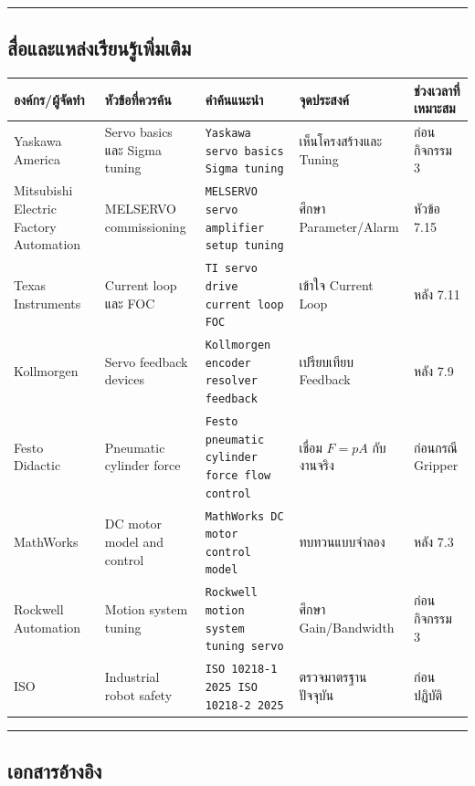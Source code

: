 \par\noindent\rule{\textwidth}{0.4pt}\par

\subsection{สื่อและแหล่งเรียนรู้เพิ่มเติม}

\begin{table}[htbp]
    \centering
    \begin{tabular}{l l l l l}
        \hline
        \textbf{องค์กร/ผู้จัดทำ} & \textbf{หัวข้อที่ควรค้น} & \textbf{คำค้นแนะนำ} & \textbf{จุดประสงค์} & \textbf{ช่วงเวลาที่เหมาะสม} \\
        \hline
        Yaskawa America & Servo basics และ Sigma tuning & \texttt{Yaskawa servo basics Sigma tuning} & เห็นโครงสร้างและ Tuning & ก่อนกิจกรรม 3 \\
        Mitsubishi Electric Factory Automation & MELSERVO commissioning & \texttt{MELSERVO servo amplifier setup tuning} & ศึกษา Parameter/Alarm & หัวข้อ 7.15 \\
        Texas Instruments & Current loop และ FOC & \texttt{TI servo drive current loop FOC} & เข้าใจ Current Loop & หลัง 7.11 \\
        Kollmorgen & Servo feedback devices & \texttt{Kollmorgen encoder resolver feedback} & เปรียบเทียบ Feedback & หลัง 7.9 \\
        Festo Didactic & Pneumatic cylinder force & \texttt{Festo pneumatic cylinder force flow control} & เชื่อม $F=pA$ กับงานจริง & ก่อนกรณี Gripper \\
        MathWorks & DC motor model and control & \texttt{MathWorks DC motor control model} & ทบทวนแบบจำลอง & หลัง 7.3 \\
        Rockwell Automation & Motion system tuning & \texttt{Rockwell motion system tuning servo} & ศึกษา Gain/Bandwidth & ก่อนกิจกรรม 3 \\
        ISO & Industrial robot safety & \texttt{ISO 10218-1 2025 ISO 10218-2 2025} & ตรวจมาตรฐานปัจจุบัน & ก่อนปฏิบัติ \\
        \hline
    \end{tabular}
\end{table}

\par\noindent\rule{\textwidth}{0.4pt}\par

\subsection{เอกสารอ้างอิง}

